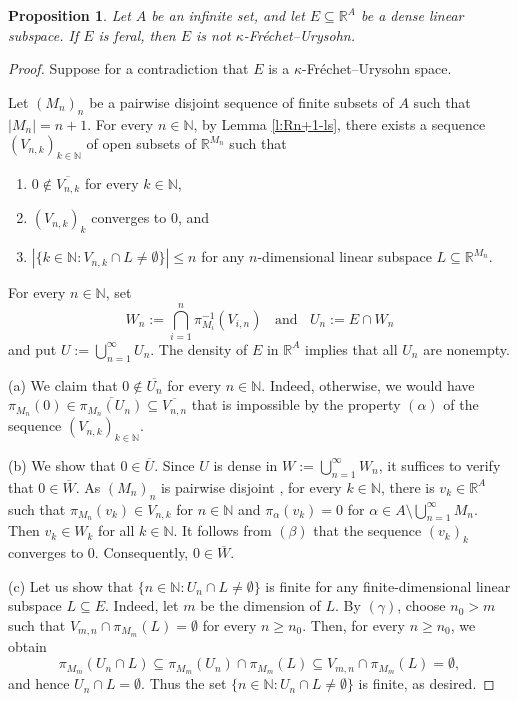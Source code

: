 \documentclass[preprint,11pt]{elsarticle}
\newtheorem{proposition}[theorem]{Proposition}
\theoremstyle{definition}
\theoremstyle{remark}
\numberwithin{equation}{section}
\numberwithin{theorem}{section}
\newcommand{\NN}{\mathbb{N}}
\newcommand{\IR}{\mathbb{R}}
\begin{document}
\begin{proposition} \label{p:feral-not-kFU}
Let $A$ be an infinite set, and let $E\subseteq \IR^A$ be a dense linear subspace. If $E$ is feral, then $E$ is not $\kappa$-Fr\'{e}chet--Urysohn.
\end{proposition}
\begin{proof}
Suppose for a contradiction that $E$ is a $\kappa$-Fr\'{e}chet--Urysohn space.
\smallskip

Let $(M_n)_n$ be a pairwise disjoint sequence of finite subsets of $A$ such that $|M_n|=n+1$. For every $n\in\NN$, by Lemma \ref{l:Rn+1-ls}, there exists a sequence $(V_{n,k})_{k\in\NN}$ of open subsets of $\IR^{M_n}$ such that
\begin{enumerate}
\item[$(\alpha)$] $0\notin \overline{V_{n,k}}$ for every $k\in\NN$,
\item[$(\beta)$] $(V_{n,k})_k$ converges to $0$, and
\item[$(\gamma)$] $|\{k\in\NN: V_{n,k}\cap L\neq\emptyset\}|\leq n$ for any $n$-dimensional linear subspace $L\subseteq \IR^{M_n}$.
\end{enumerate}

For every  $n\in \NN$, set
\[
W_n := \bigcap_{i=1}^n \pi^{-1}_{M_i}(V_{i,n})\;\; \mbox{ and }\;\; U_n := E \cap W_n
\]
and put $U:=\bigcup_{n=1}^\infty U_n$. The density of $E$ in $\IR^A$ implies that all $U_n$ are nonempty.
\smallskip

(a) We claim that $0\notin\overline{U_n}$ for every  $n\in\NN$. Indeed, otherwise, we would have $\pi_{M_n}(0)\in \overline{\pi_{M_n}(U_n)}\subseteq \overline{V_{n,n}}$ that is impossible by the property $(\alpha)$ of the sequence $(V_{n,k})_{k\in\NN}$.
\smallskip

(b) We show that $0\in \overline{U}$. Since $U$ is dense in $W := \bigcup_{n=1}^\infty W_n$, it suffices to verify that $0\in \overline{W}$.
As $(M_n)_n$ is pairwise disjoint , for every $k\in \NN$, there is $v_k\in \IR^A$ such that $\pi_{M_n}(v_k)\in V_{n,k}$ for $n\in \NN$ and $\pi_\alpha(v_k)=0$ for $\alpha\in A\setminus \bigcup_{n=1}^\infty M_n$. Then $v_k\in W_k$ for all $k\in \NN$. It follows from $(\beta)$ that the sequence $(v_k)_k$ converges to $0$. Consequently, $0\in \overline{W}$.
\smallskip

(c) Let us show that $\{n\in\NN: U_{n}\cap L\neq\emptyset\}$  is finite for any finite-dimensional linear subspace $L\subseteq E$. Indeed, let $m$ be the dimension of $L$. By $(\gamma)$, choose $n_0>m$ such that $V_{m,n}\cap \pi_{M_m}(L)=\emptyset$ for every $n\geq n_0$. Then, for every $n\geq n_0$, we obtain
\[
\pi_{M_m}(U_n \cap L)\subseteq \pi_{M_m}(U_n) \cap \pi_{M_m}(L)\subseteq V_{m,n}\cap \pi_{M_m}(L)=\emptyset,
\]
and hence $U_n \cap L=\emptyset$. Thus the set $\{n\in\NN: U_{n}\cap L\neq\emptyset\}$ is finite, as desired.
\smallskip


\end{proof}
\end{document}
